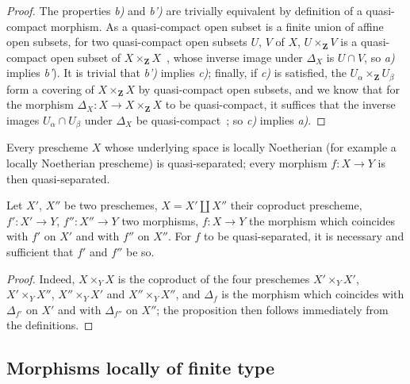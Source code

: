 \begin{proof}
The properties \emph{b)} and \emph{b')} are trivially equivalent by definition of a quasi-compact
morphism. As a quasi-compact open subset is a finite union of affine open subsets,
for two quasi-compact open subsets $U$, $V$ of $X$, $U\times_{\mathbf{Z}} V$ is a quasi-compact open subset
of $X\times_{\mathbf{Z}} X$~, whose inverse image under $\Delta_X$ is $U\cap V$, so \emph{a)} implies \emph{b'}).
It is trivial that \emph{b')} implies \emph{c)}; finally, if \emph{c)} is satisfied, the $U_\alpha\times_{\mathbf{Z}} U_\beta$ form a
covering of $X\times_{\mathbf{Z}} X$ by quasi-compact open subsets, and we know that for the
morphism $\Delta_X:X\to X\times_{\mathbf{Z}} X$ to be quasi-compact, it suffices that the inverse images
$U_\alpha\cap U_\beta$ under $\Delta_X$ be quasi-compact~; so \emph{c)} implies \emph{a)}.
\end{proof}

\begin{corollary}[1.2.8]
\label{IV.1.2.8}
Every prescheme $X$ whose underlying space is locally Noetherian
\textnormal{(}for example a locally Noetherian prescheme\textnormal{)} is quasi-separated; every morphism $f:X\to Y$ is
then quasi-separated.
\end{corollary}

\begin{proposition}[1.2.9]
\label{IV.1.2.9}
Let $X'$, $X''$ be two preschemes, $X=X'\coprod X''$ their coproduct prescheme,
$f':X'\to Y$, $f'':X''\to Y$ two morphisms, $f:X\to Y$ the morphism which coincides with $f'$ on $X'$
and with $f''$ on $X''$. For $f$ to be quasi-separated, it is necessary and sufficient that $f'$ and $f''$ be so.
\end{proposition}

\begin{proof}
Indeed, $X\times_Y X$ is the coproduct of the four preschemes $X'\times_Y X'$, $X'\times_Y X''$, $X''\times_Y X'$
and $X''\times_Y X''$, and $\Delta_f$ is the morphism which coincides with $\Delta_{f'}$ on $X'$ and with $\Delta_{f''}$ on $X''$;
the proposition then follows immediately from the definitions.
\end{proof}

\subsection{Morphisms locally of finite type}
\label{subsection:IV.1.3}

